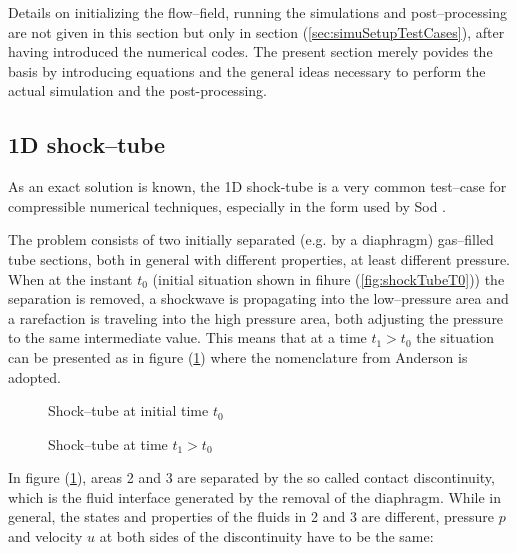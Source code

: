 \documentclass{report}
\begin{document}
Details on initializing the flow--field, running the simulations and post--processing are not given in this section but only in section (\ref{sec:simuSetupTestCases}), after having introduced the numerical codes. The present section merely povides the basis by introducing equations and the general ideas necessary to perform the actual simulation and the post-processing.

\subsection{1D shock--tube}
\label{sec:TestCases_1DshockTube}
As an exact solution is known, the 1D shock-tube is a very common test--case for compressible numerical techniques, especially in the form used by Sod \cite{Sod1978}.

 The problem consists of two initially separated (e.g. by a diaphragm) gas--filled tube sections, both in general with different properties, at least different pressure. When at the instant $t_0$ (initial situation shown in fihure (\ref{fig:shockTubeT0})) the separation is removed, a shockwave is propagating into the low--pressure area and a rarefaction is traveling into the high pressure area, both adjusting the pressure to the same intermediate value. This means that at a time $t_1>t_0$ the situation can be presented as in figure (\ref{fig:shockTubeT1}) where the nomenclature from Anderson \cite{Anderson2002} is adopted.

\begin{figure}[h]
    \centering
            
      \caption{Shock--tube at initial time $t_0$}
      \label{fig:shockTubeT0}
\vspace*{0.3cm}
      
      \caption{Shock--tube at time $t_1>t_0$}
      \label{fig:shockTubeT1}
\end{figure}

In figure (\ref{fig:shockTubeT1}), areas 2 and 3 are separated by the so called contact discontinuity, which is the fluid interface generated by the removal of the diaphragm. While in general, the states and properties of the fluids in 2 and 3 are different, pressure $p$ and velocity $u$ at both sides of the discontinuity have to be the same:
\end{document}
